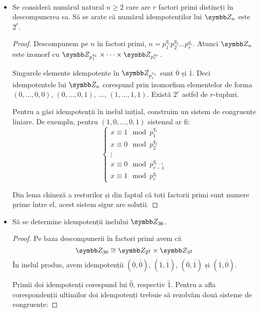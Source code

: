 \begin{exercise}[1.28]
~
\begin{itemize}
    \item Se consideră numărul natural \(n \geq 2\) care are \(r\) factori primi distincți în descompunerea sa.
    Să se arate că numărul idempotenților lui \(\integersmod{n}\) este \(2^r\).
    \begin{proof}
    Descompunem pe \(n\) în factori primi, \(n = p_1^{q_1} p_2^{q_2} \dots p_r^{q_r}\).
    Atunci \(\integersmod{n}\) este izomorf cu \(\integersmod{p_1^{q_1}} \times \dots \times \integersmod{p_r^{q_r}}\).
    
    Singurele elemente idempotente în \(\integersmod{p_i^{r_i}}\) sunt \(\overline{0}\) și \(\overline{1}\). Deci idempotentele lui \(\integersmod{n}\) corespund prin izomorfism elementelor de forma \((0, \dots, 0, 0)\), \((0, \dots, 0, 1)\), \(\dots\), \((1, \dots, 1, 1)\). Există \(2^r\) astfel de \(r\)-tupluri.
    
    Pentru a găsi idempotenții în inelul inițial, construim un sistem de congruențe liniare. De exemplu, pentru \((1, 0, \dots, 0, 1)\) sistemul ar fi:
    \[
        \begin{cases}
            x \equiv 1 \mod p_1^{q_1} \\
            x \equiv 0 \mod p_2^{q_2} \\
            \vdots \\
            x \equiv 0 \mod p_{r-1}^{q_{r-1}} \\
            x \equiv 1 \mod p_r^{q_r}
        \end{cases}
    \]
    
    Din lema chineză a resturilor și din faptul că toți factorii primi sunt numere prime între el, acest sistem sigur are soluții.
    \end{proof}

    \item Să se determine idempotenții inelului \(\integersmod{36}\).
    \begin{proof}
    Pe baza descompunerii în factori primi avem că
    \[
        \integersmod{36} \cong \integersmod{2^2} \times \integersmod{3^2}
    \]
    În inelul produs, avem idempotenții \((\overline{0}, \overline{\overline{0}})\), \((\overline{1}, \overline{\overline{1}})\), \((\overline{0}, \overline{\overline{1}})\) și \((\overline{1}, \overline{\overline{0}})\).
    
    Primii doi idempotenți corespund lui \(\widehat{0}\), respectiv \(\widehat{1}\). Pentru a afla corespondenții ultimilor doi idempotenți trebuie să rezolvăm două sisteme de congruențe:
    

\end{proof}
\end{itemize}
\end{exercise}
